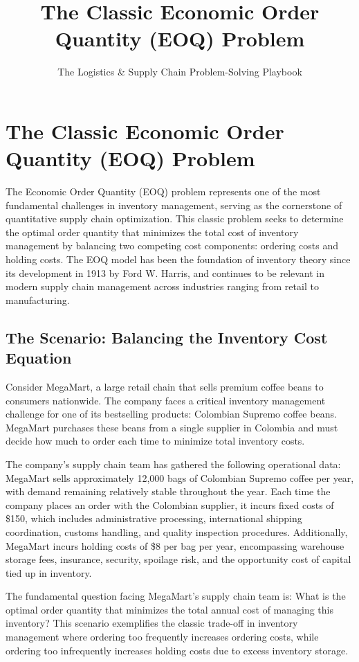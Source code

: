 \documentclass{article}
\title{The Classic Economic Order Quantity (EOQ) Problem}
\author{The Logistics \& Supply Chain Problem-Solving Playbook}
\date{}
\begin{document}
\maketitle

\section{The Classic Economic Order Quantity (EOQ) Problem}

The Economic Order Quantity (EOQ) problem represents one of the most fundamental challenges in inventory management, serving as the cornerstone of quantitative supply chain optimization. This classic problem seeks to determine the optimal order quantity that minimizes the total cost of inventory management by balancing two competing cost components: ordering costs and holding costs. The EOQ model has been the foundation of inventory theory since its development in 1913 by Ford W. Harris, and continues to be relevant in modern supply chain management across industries ranging from retail to manufacturing.

\subsection{The Scenario: Balancing the Inventory Cost Equation}

Consider MegaMart, a large retail chain that sells premium coffee beans to consumers nationwide. The company faces a critical inventory management challenge for one of its bestselling products: Colombian Supremo coffee beans. MegaMart purchases these beans from a single supplier in Colombia and must decide how much to order each time to minimize total inventory costs.

The company's supply chain team has gathered the following operational data: MegaMart sells approximately 12,000 bags of Colombian Supremo coffee per year, with demand remaining relatively stable throughout the year. Each time the company places an order with the Colombian supplier, it incurs fixed costs of \$150, which includes administrative processing, international shipping coordination, customs handling, and quality inspection procedures. Additionally, MegaMart incurs holding costs of \$8 per bag per year, encompassing warehouse storage fees, insurance, security, spoilage risk, and the opportunity cost of capital tied up in inventory.

The fundamental question facing MegaMart's supply chain team is: What is the optimal order quantity that minimizes the total annual cost of managing this inventory? This scenario exemplifies the classic trade-off in inventory management where ordering too frequently increases ordering costs, while ordering too infrequently increases holding costs due to excess inventory storage.
\end{document}
